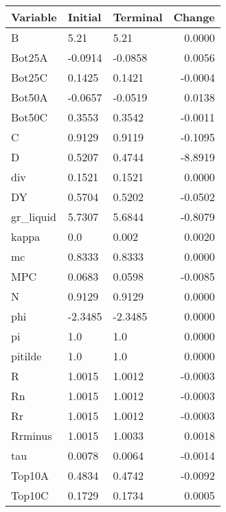 \begin{table}
\centering
\label{tab:stst_comparison_very_slow_phi_wedge_permanent}
\begin{tabular}{lllr}
\toprule
                Variable & Initial & Terminal &  Change \\
\midrule
                       B &    5.21 &     5.21 &  0.0000 \\
                  Bot25A & -0.0914 &  -0.0858 &  0.0056 \\
                  Bot25C &  0.1425 &   0.1421 & -0.0004 \\
                  Bot50A & -0.0657 &  -0.0519 &  0.0138 \\
                  Bot50C &  0.3553 &   0.3542 & -0.0011 \\
                       C &  0.9129 &   0.9119 & -0.1095 \\
                       D &  0.5207 &   0.4744 & -8.8919 \\
                     div &  0.1521 &   0.1521 &  0.0000 \\
                      DY &  0.5704 &   0.5202 & -0.0502 \\
               gr\_liquid &  5.7307 &   5.6844 & -0.8079 \\
                   kappa &     0.0 &    0.002 &  0.0020 \\
                      mc &  0.8333 &   0.8333 &  0.0000 \\
                     MPC &  0.0683 &   0.0598 & -0.0085 \\
                       N &  0.9129 &   0.9129 &  0.0000 \\
                     phi & -2.3485 &  -2.3485 &  0.0000 \\
                      pi &     1.0 &      1.0 &  0.0000 \\
                 pitilde &     1.0 &      1.0 &  0.0000 \\
                       R &  1.0015 &   1.0012 & -0.0003 \\
                      Rn &  1.0015 &   1.0012 & -0.0003 \\
                      Rr &  1.0015 &   1.0012 & -0.0003 \\
                 Rrminus &  1.0015 &   1.0033 &  0.0018 \\
                     tau &  0.0078 &   0.0064 & -0.0014 \\
                  Top10A &  0.4834 &   0.4742 & -0.0092 \\
                  Top10C &  0.1729 &   0.1734 &  0.0005 \\

\end{tabular}
\end{table}
